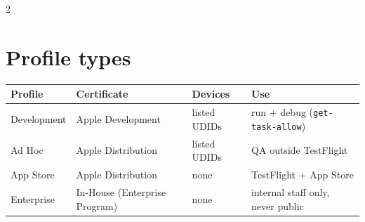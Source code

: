 \documentclass[8pt]{extarticle}
\begin{document}
\begin{multicols}{2}
\raggedright

\section{Profile types}
{\footnotesize
\begin{tabular}{@{}>{\raggedright\arraybackslash}p{15mm}>{\raggedright\arraybackslash}p{19mm}>{\raggedright\arraybackslash}p{13mm}>{\raggedright\arraybackslash}p{26mm}@{}}
\toprule
\textbf{Profile} & \textbf{Certificate} & \textbf{Devices} & \textbf{Use} \\
\midrule
Development & Apple Development & listed UDIDs & run + debug (\texttt{get-task-allow}) \\
Ad Hoc & Apple Distribution & listed UDIDs & QA outside TestFlight \\
App Store & Apple Distribution & none & TestFlight + App Store \\
Enterprise & In-House (Enterprise Program) & none & internal staff only, never public \\
\bottomrule
\end{tabular}}


\end{multicols}
\end{document}
